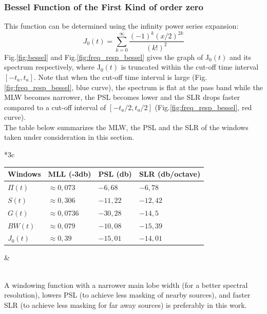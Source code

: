 \documentclass[useAMS,usenatbib]{mn2e}
\begin{document}
\subsubsection{Bessel Function of the First Kind of order zero}
 This function can  be determined using the infinity power series expansion:
\begin{equation}
J_0(t) = \sum_{k=0}^{\infty}\frac{(-1)^k (x/2)^{2k}}{(k!)^2}
\end{equation}
 Fig.\ref{fig:bessel} and Fig.\ref{fig:freq_resp_bessel} gives the graph of J$_0(t)$ and its spectrum respectively, where 
J$_0(t)$ is truncated within the cut-off time interval $[-t_a,t_a]$. Note that when the cut-off time interval is large 
(Fig.\ref{fig:freq_resp_bessel}, blue curve), the spectrum is flat at the pass band while the MLW becomes narrower,  the PSL 
becomes lower and the SLR drops faster compared to a cut-off interval of $[-t_a/2,t_a/2]$ (Fig.\ref{fig:freq_resp_bessel}, red curve).\\
 The table below summarizes the MLW, the PSL and the SLR of the windows taken under consideration in this section.
\begin{tabular}{*3{c}}
 \\
 \begin{tabular}{|l|l|l|l|}
  \footnotesize Windows &\textbf{\footnotesize MLL (-3db)}&\textbf{\footnotesize PSL (db)} &\textbf{\footnotesize SLR (db/octave) }  \\
  \hline\hline
  {\footnotesize $\Pi(t)$} &{\footnotesize $\approx 0,073$} &{\footnotesize $-6,68$}&{\footnotesize $-6,78$}\\
  {\footnotesize $S(t)$} &{\footnotesize  $\approx0,306$}&{\footnotesize  $-11,22$}&{\footnotesize  $-12,42$} \\
  {\footnotesize $G(t)$} & {\footnotesize $\approx0,0736$}&{\footnotesize  $-30,28$}&{\footnotesize  $-14,5$}\\ 
  {\footnotesize $BW(t)$} &{\footnotesize  $\approx0,079$} &{\footnotesize $-10,08$ }&{\footnotesize  $-15,39$}\\
  {\footnotesize $J_0(t)$} &{\footnotesize  $\approx 0,39$} &{\footnotesize $ -15,01$ }&{\footnotesize  $ -14,01$}
  \end{tabular}& \label{BDWBnoise}
\end{tabular}\\
A windowing function with a narrower main lobe width (for a better spectral resolution), lowers PSL (to achieve less
masking of nearby sources), and faster SLR (to achieve less masking for far away sources) is preferably in this work.
\end{document}
